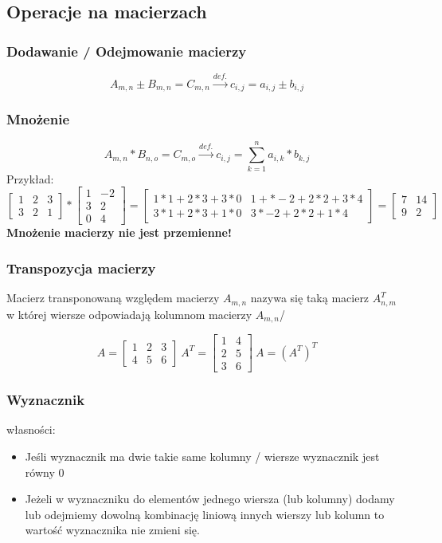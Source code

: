 \subsection{Operacje na macierzach}
\subsubsection{Dodawanie / Odejmowanie macierzy}
$$A_{m,n} \pm B_{m,n} = C_{m,n} \overset{def.}{\longrightarrow} c_{i,j}=a_{i,j}\pm b_{i,j}$$
\subsubsection{Mnożenie}
$$A_{m,n} * B_{n,o} = C_{m,o} \overset{def.}{\longrightarrow} c_{i,j}= \sum_{k=1}^n a_{i,k} * b_{k,j}$$
Przykład:
$$\begin{bmatrix}
1 & 2 & 3\\ 
3 & 2 & 1
\end{bmatrix} * \begin{bmatrix}
1 & -2\\ 
3 & 2\\ 
0 & 4
\end{bmatrix}=\begin{bmatrix}
1*1+2*3+3*0 & 1+*-2+2*2+3*4\\ 
3*1+2*3+1*0 & 3*-2+2*2+1*4
\end{bmatrix} = \begin{bmatrix}
7&14\\
9&2
\end{bmatrix}$$
\textbf{Mnożenie macierzy nie jest przemienne!}
\subsubsection{Transpozycja macierzy}
\begin{definition}
Macierz transponowaną względem macierzy $A_{m,n}$ nazywa się taką macierz $A_{n,m}^T$ w której wiersze odpowiadają kolumnom macierzy $A_{m,n}$/
\end{definition}
$$A=\begin{bmatrix}
1 & 2& 3\\
4& 5 &6
\end{bmatrix}\ A^T=\begin{bmatrix}
1 & 4\\
2 & 5\\
3 & 6
\end{bmatrix}\ A=(A^T)^T$$

\subsubsection{Wyznacznik}
własności:
\begin{itemize}
\item Jeśli wyznacznik ma dwie takie same kolumny / wiersze wyznacznik jest równy 0
\item Jeżeli w wyznaczniku do elementów jednego wiersza (lub kolumny) dodamy lub odejmiemy dowolną kombinację liniową innych wierszy lub kolumn to wartość wyznacznika nie zmieni się.
\end{itemize}
